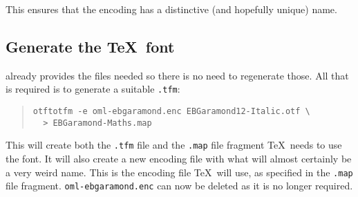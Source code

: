 \documentclass[12pt,british,a4paper]{article}
\begin{document}
This ensures that the encoding has a distinctive (and hopefully unique) name.

\subsection{Generate the \TeX\ font}\label{subsec:tfm}
 already provides the  files needed so there is no need to regenerate those.
All that is required is to generate a suitable \verb|.tfm|:

\begin{quote}
\begin{verbatim}
otftotfm -e oml-ebgaramond.enc EBGaramond12-Italic.otf \
  > EBGaramond-Maths.map
\end{verbatim}
\end{quote}

This will create both the \verb|.tfm| file and the \verb|.map| file fragment \TeX\ needs to use the font.
It will also create a new encoding file with what will almost certainly be a very weird name.
This is the encoding file \TeX\ will use, as specified in the \verb|.map| file fragment.
\verb|oml-ebgaramond.enc| can now be deleted as it is no longer required.

\end{document}
